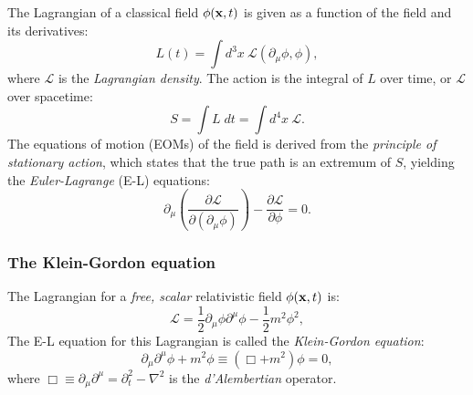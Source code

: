 The Lagrangian of a classical field $\phi(\mathbf{x}, t)$ is given as a function of the field and its derivatives:
\begin{equation}
	\label{eq:01_qft_field_lagrangian_density}
	L(t) = \int d^3x\ \mathcal{L}(\partial_\mu\phi, \phi),
\end{equation}
where $\mathcal{L}$ is the \textit{Lagrangian density}.
The action is the integral of $L$ over time, or $\mathcal{L}$ over spacetime:
\begin{equation}
	\label{eq:01_qft_field_action}
	S = \int L\;dt = \int d^4x\ \mathcal{L}.
\end{equation}
The equations of motion (EOMs) of the field is derived from the \textit{principle of stationary action}, which states that the true path is an extremum of $S$, yielding the \textit{Euler-Lagrange} (E-L) equations:
\begin{equation}
	\label{eq:01_qft_field_euler_lagrange}
	\partial_\mu\left(\frac{\partial\mathcal{L}}{\partial(\partial_\mu\phi)}\right) - \frac{\partial\mathcal{L}}{\partial\phi} = 0.
\end{equation}

\subsubsection{The Klein-Gordon equation}

The Lagrangian for a \textit{free, scalar} relativistic field $\phi(\mathbf{x}, t)$ is:
\begin{equation}
	\label{eq:01_qft_field_kg_lagrangian}
	\mathcal{L} = \frac{1}{2}\partial_\mu\phi\partial^\mu\phi - \frac{1}{2}m^2\phi^2,
\end{equation}
The E-L equation for this Lagrangian is called the \textit{Klein-Gordon equation}:
\begin{equation}
	\label{eq:01_qft_field_kg_equation}
	\partial_\mu\partial^\mu\phi + m^2\phi \equiv (\Box + m^2)\phi = 0,
\end{equation}
where $\Box \equiv \partial_\mu\partial^\mu = \partial_t^2 - \nabla^2$ is the \textit{d'Alembertian} operator.

